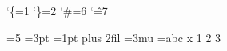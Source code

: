 \catcode`\{=1 \catcode`\}=2 \catcode`\#=6 \catcode`\^=7

=5 =3pt =1pt plus 2fil =3mu ={abc}
\hbox{x} 1 2 3 
\protected\def\p{q}
\dump
